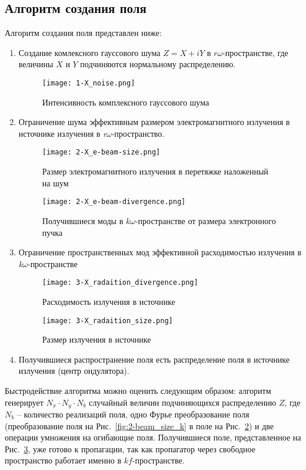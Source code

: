 \subsection{Алгоритм создания поля}
Алгоритм создания поля представлен ниже: 
\begin{enumerate}
\item \label{noise} Создание комлексного гауссового шума $Z = X + iY$ в $r\omega$-пространстве, где величины $X$ и $Y$ подчиняются нормальному распределению.
\begin{figure}[H] 
	\centering 	\texttt{[image: 1-X\_noise.png]}
	\caption{Интенсивность комплексного гауссового шума}
	\label{fig:1-noise}
\end{figure}
\item \label{beam_s} Ограничение шума эффективным размером электромагнитного излучения в источнике излучения в \textit{r$\omega$}-пространство.
\begin{figure}[H]
	\centering
	\begin{minipage}{0.45\textwidth}
		\centering
		\texttt{[image: 2-X\_e-beam-size.png]}
		\caption{Размер электромагнитного излучения в перетяжке наложенный на шум}
		\label{fig:2-beam_size_k}
	\end{minipage}
	\begin{minipage}{0.45\textwidth}
		\centering
		\texttt{[image: 2-X\_e-beam-divergence.png]}
		\caption{Получившиеся моды в $k\omega$-пространстве от размера электронного пучка}
		\label{fig:2-beam_size_s}
	\end{minipage}\hfill
\end{figure}
\item \label{beam_k} Ограничение пространственных мод эффективной расходимостью излучения в \textit{k$\omega$}-пространстве
\begin{figure}[H]
	\centering
	\begin{minipage}{0.45\textwidth}
		\centering
		\texttt{[image: 3-X\_radaition\_divergence.png]}
		\caption{Расходимость излучения в источнике}
		\label{fig:3-beam_s}
	\end{minipage}
	\begin{minipage}{0.45\textwidth}
		\centering
		\texttt{[image: 3-X\_radaition\_size.png]}
		\caption{Размер излучения в источнике}
		\label{fig:3-beam_k}
	\end{minipage}
\end{figure}
\item Получившиеся распространение поля есть распределение поля в источнике излучения (центр ондулятора).
\end{enumerate}
Быстродействие алгоритма можно оценить следующим образом: алгоритм генерирует $N_x \cdot N_y \cdot N_b$ случайный величин подчиняющихся распределению $Z$, где $N_b$ -- количество реализаций поля, одно Фурье преобразование поля (преобразование поля на Рис.~\ref{fig:2-beam_size_k} в поле на Рис.~\ref{fig:2-beam_size_s}) и две операции умножения на огибающие поля. Получившиеся поле, представленное на Рис.~\ref{fig:3-beam_k}, уже готово к пропагации, так как пропагатор через свободное пространство работает именно в $kf$-пространстве.
